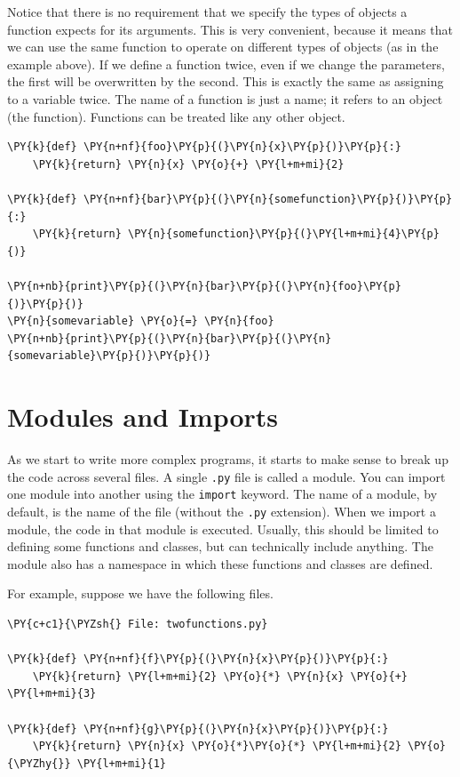 Notice that there is no requirement that we specify the types of objects a function expects for its arguments.  This is very convenient, because it means that we can use the same function to operate on different types of objects (as in the example above).  If we define a function twice, even if we change the parameters, the first will be overwritten by the second.  This is exactly the same as assigning to a variable twice.  The name of a function is just a name; it refers to an object (the function).  Functions can be treated like any other object.

\begin{Verbatim}[commandchars=\\\{\}]
\PY{k}{def} \PY{n+nf}{foo}\PY{p}{(}\PY{n}{x}\PY{p}{)}\PY{p}{:}
    \PY{k}{return} \PY{n}{x} \PY{o}{+} \PY{l+m+mi}{2}

\PY{k}{def} \PY{n+nf}{bar}\PY{p}{(}\PY{n}{somefunction}\PY{p}{)}\PY{p}{:}
    \PY{k}{return} \PY{n}{somefunction}\PY{p}{(}\PY{l+m+mi}{4}\PY{p}{)}

\PY{n+nb}{print}\PY{p}{(}\PY{n}{bar}\PY{p}{(}\PY{n}{foo}\PY{p}{)}\PY{p}{)}
\PY{n}{somevariable} \PY{o}{=} \PY{n}{foo}
\PY{n+nb}{print}\PY{p}{(}\PY{n}{bar}\PY{p}{(}\PY{n}{somevariable}\PY{p}{)}\PY{p}{)}
\end{Verbatim}


\section{Modules and Imports}


As we start to write more complex programs, it starts to make sense to break up the code across several files.  A single \texttt{.py} file is called a module.  You can import one module into another using the \texttt{import} keyword.  The name of a module, by default, is the name of the file (without the \texttt{.py} extension).  When we import a module, the code in that module is executed.  Usually, this should be limited to defining some functions and classes, but can technically include anything.  The module also has a namespace in which these functions and classes are defined.


For example, suppose we have the following files.

\begin{Verbatim}[commandchars=\\\{\}]
\PY{c+c1}{\PYZsh{} File: twofunctions.py}

\PY{k}{def} \PY{n+nf}{f}\PY{p}{(}\PY{n}{x}\PY{p}{)}\PY{p}{:}
    \PY{k}{return} \PY{l+m+mi}{2} \PY{o}{*} \PY{n}{x} \PY{o}{+} \PY{l+m+mi}{3}

\PY{k}{def} \PY{n+nf}{g}\PY{p}{(}\PY{n}{x}\PY{p}{)}\PY{p}{:}
    \PY{k}{return} \PY{n}{x} \PY{o}{*}\PY{o}{*} \PY{l+m+mi}{2} \PY{o}{\PYZhy{}} \PY{l+m+mi}{1}
\end{Verbatim}


